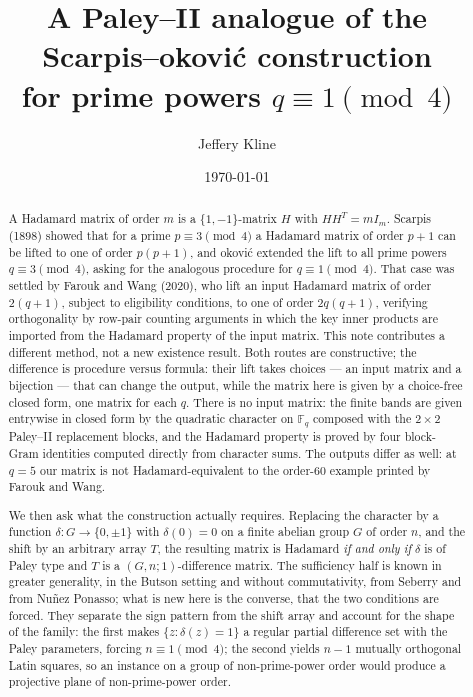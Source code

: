 \documentclass[11pt]{article}
\title{A Paley--II analogue of the Scarpis--\DJ okovi\'c construction\\
       for prime powers \(q\equiv 1\pmod 4\)}
\author{Jeffery Kline}
\date{\today}
\newcommand{\F}{\mathbb F}
\begin{document}
\maketitle

\begin{abstract}
A Hadamard matrix of order \(m\) is a \(\{1,-1\}\)-matrix \(H\) with
\(HH^{T}=mI_{m}\).  Scarpis (1898) showed that for a prime
\(p\equiv 3\pmod 4\) a Hadamard matrix of order \(p+1\) can be lifted to
one of order \(p(p+1)\), and \DJ okovi\'c extended the lift to all prime
powers \(q\equiv 3\pmod 4\), asking for the analogous procedure for
\(q\equiv 1\pmod 4\).  That case was settled by Farouk and Wang (2020),
who lift an input Hadamard matrix of order \(2(q+1)\), subject to
eligibility conditions, to one of order \(2q(q+1)\), verifying
orthogonality by row-pair counting arguments in which the key inner
products are imported from the Hadamard property of the input matrix.
This note contributes a different method, not a new existence result.
Both routes are constructive; the difference is procedure versus
formula: their lift takes choices --- an input matrix and a bijection
--- that can change the output, while the matrix here is given by a
choice-free closed form, one matrix for each \(q\).  There is no input
matrix: the finite bands are given entrywise in
closed form by the quadratic character on \(\F_q\) composed with the
\(2\times 2\) Paley--II replacement blocks, and the Hadamard property
is proved by four block-Gram identities computed directly from
character sums.  The outputs differ as well: at \(q=5\) our matrix is
not Hadamard-equivalent to the order-\(60\) example printed by Farouk
and Wang.

We then ask what the construction actually requires.  Replacing the
character by a function \(\delta\colon G\to\{0,\pm1\}\) with
\(\delta(0)=0\) on a finite abelian group \(G\) of order \(n\), and the
shift by an arbitrary array \(T\), the resulting matrix is Hadamard
\emph{if and only if} \(\delta\) is of Paley type and \(T\) is a
\((G,n;1)\)-difference matrix.  The sufficiency half is known in greater
generality, in the Butson setting and without commutativity, from Seberry
and from Nu\~nez Ponasso; what is new here is the converse, that the two
conditions are forced.  They separate the sign
pattern from the shift array and account for the shape of the family:
the first makes \(\{z:\delta(z)=1\}\) a regular partial difference set
with the Paley parameters, forcing \(n\equiv1\pmod4\); the second
yields \(n-1\) mutually orthogonal Latin squares, so an instance on a
group of non-prime-power order would produce a projective plane of
non-prime-power order.


\end{abstract}
\end{document}

